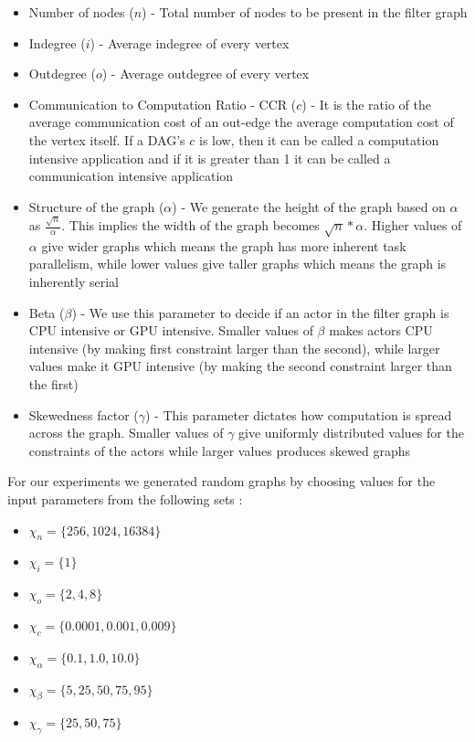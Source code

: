 \begin{itemize}
\item Number of nodes ($n$) - Total number of nodes to be present in the
  filter graph
\item Indegree ($i$) - Average indegree of every vertex
\item Outdegree ($o$) - Average outdegree of every vertex
\item Communication to Computation Ratio - CCR ($c$) - It is the ratio
  of the average communication cost of an out-edge the average
  computation cost of the vertex itself. If a DAG's $c$ is low, then it
  can be called a computation intensive application and if it is greater
  than 1 it can be called a communication intensive application
\item Structure of the graph ($\alpha$) - We generate the height of the
  graph based on $\alpha$ as $\frac{\sqrt{n}}{\alpha}$. This implies the
  width of the graph becomes $\sqrt{n}*{\alpha}$. Higher values of
  $\alpha$ give wider graphs which means the graph has more inherent
  task parallelism, while lower values give taller graphs which means
  the graph is inherently serial
\item Beta ($\beta$) - We use this parameter to decide if an actor in
  the filter graph is CPU intensive or GPU intensive. Smaller values of
  $\beta$ makes actors CPU intensive (by making first constraint larger
  than the second), while larger values make it GPU intensive (by making
  the second constraint larger than the first)
\item Skewedness factor ($\gamma$) - This parameter dictates how
  computation is spread across the graph. Smaller values of $\gamma$
  give uniformly distributed values for the constraints of the actors
  while larger values produces skewed graphs
\end{itemize}

For our experiments we generated random graphs by choosing values for the input
parameters from the following sets :

\begin{itemize}
\item $\chi_{n} = \{256, 1024, 16384\}$
\item $\chi_{i} = \{1\}$
\item $\chi_{o} = \{2, 4, 8\}$
\item $\chi_{c} = \{0.0001, 0.001, 0.009\}$
\item $\chi_{\alpha} = \{0.1, 1.0, 10.0\}$
\item $\chi_{\beta} = \{5, 25, 50, 75, 95\}$
\item $\chi_{\gamma} = \{25, 50, 75\}$
\end{itemize}

